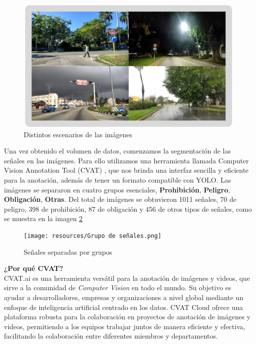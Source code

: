 \documentclass{article}
\begin{document}
\begin{figure}[h]
\centering
\includegraphics[width=1.0\textwidth]{resources/stages.png}
\caption{Distintos escenarios de las imágenes}
\label{fig:scenarios}
\end{figure}


Una vez obtenido el volumen de datos, comenzamos la segmentación de las señales en las imágenes. Para ello utilizamos una herramienta llamada Computer Vision Annotation Tool (CVAT) \cite{ref10}, que nos brinda una interfaz sencilla y eficiente para la anotación, además de tener un formato compatible con YOLO. Las imágenes se separaron en cuatro grupos esenciales, \textbf{Prohibición}, \textbf{Peligro}, \textbf{Obligación}, \textbf{Otras}. Del total de imágenes se obtuvieron 1011 señales, 70 de peligro, 398 de prohibición, 87 de obligación y 456 de otros tipos de señales, como se muestra en la imagen \ref{fig:Grupos}

\begin{figure}[h]
\centering
\texttt{[image: resources/Grupo de señales.png]}
\caption{Señales separadas por grupos}
\label{fig:Grupos}
\end{figure}

\begin{tcolorbox}
\textbf{¿Por qué CVAT?}\\
CVAT.ai es una herramienta versátil para la anotación de imágenes y videos, que sirve a la comunidad de \textit{Computer Vision} en todo el mundo. Su objetivo es ayudar a desarrolladores, empresas y organizaciones a nivel global mediante un enfoque de inteligencia artificial centrado en los datos. CVAT Cloud ofrece una plataforma robusta para la colaboración en proyectos de anotación de imágenes y videos, permitiendo a los equipos trabajar juntos de manera eficiente y efectiva, facilitando la colaboración entre diferentes miembros y departamentos.
\end{tcolorbox}
\end{document}
